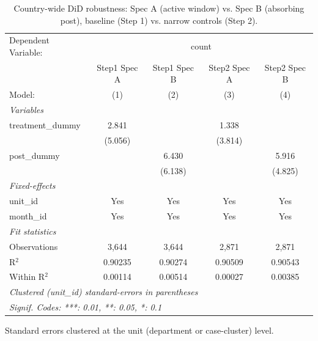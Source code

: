 \begin{table}[htbp]
   \caption{\label{tab:did_country_robustness} Country-wide DiD robustness: Spec A (active window) vs. Spec B (absorbing post), baseline (Step 1) vs. narrow controls (Step 2).}
   \centering
   \begin{tabular}{lcccc}
      \tabularnewline \midrule \midrule
      Dependent Variable: & \multicolumn{4}{c}{count}\\
                        & Step1 Spec A & Step1 Spec B & Step2 Spec A & Step2 Spec B \\   
      Model:            & (1)          & (2)          & (3)          & (4)\\  
      \midrule
      \emph{Variables}\\
      treatment\_dummy  & 2.841        &              & 1.338        &   \\   
                        & (5.056)      &              & (3.814)      &   \\   
      post\_dummy       &              & 6.430        &              & 5.916\\   
                        &              & (6.138)      &              & (4.825)\\   
      \midrule
      \emph{Fixed-effects}\\
      unit\_id          & Yes          & Yes          & Yes          & Yes\\  
      month\_id         & Yes          & Yes          & Yes          & Yes\\  
      \midrule
      \emph{Fit statistics}\\
      Observations      & 3,644        & 3,644        & 2,871        & 2,871\\  
      R$^2$             & 0.90235      & 0.90274      & 0.90509      & 0.90543\\  
      Within R$^2$      & 0.00114      & 0.00514      & 0.00027      & 0.00385\\  
      \midrule \midrule
      \multicolumn{5}{l}{\emph{Clustered (unit\_id) standard-errors in parentheses}}\\
      \multicolumn{5}{l}{\emph{Signif. Codes: ***: 0.01, **: 0.05, *: 0.1}}\\
   \end{tabular}
   
   \par \raggedright 
   Standard errors clustered at the unit (department or case-cluster) level.
\end{table}
